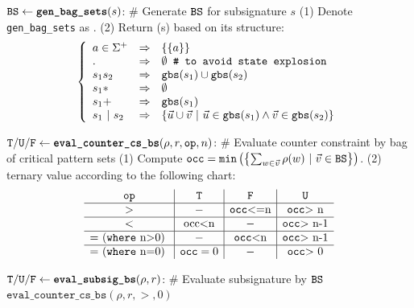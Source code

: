 \begin{small}
\begin{algorithm}[bt]
$\texttt{BS} \leftarrow {\texttt{\textbf{gen\_bag\_sets}}}(s)$: 
\newline
\# Generate $\texttt{BS}$ for subsignature $s$ \newline
(1) Denote \texttt{gen\_bag\_sets} as \gbw. \newline
(2) Return \bw(s) based on its structure:
\[
\left\{ 
\begin{array}{l l l}
	a \in \Sigma^+ &\Rightarrow & \{\{a\}\} \\
	. 	& \Rightarrow & \emptyset \texttt{~\# to avoid state explosion} \\
	s_1s_2 & \Rightarrow& \texttt{gbs}(s_1) \cup \texttt{gbs}(s_2) \\
	s_1 *& \Rightarrow& \emptyset \\
	s_1+ & \Rightarrow& \texttt{gbs}(s_1) \\
	s_1~|~s_2 & \Rightarrow& \{\vec{u} \cup \vec{v}~|~ \vec{u} \in \texttt{gbs}(s_1) \wedge \vec{v}\in \texttt{gbs}(s_2) \}
\end{array}
\right.
\]

$\texttt{T}/\texttt{U}/\texttt{F} \leftarrow \texttt{\textbf{eval\_counter\_cs\_bs}}(\rho, r, \texttt{op}, n)$:  \newline
\# Evaluate counter constraint by bag of critical pattern sets \newline
(1) Compute $\texttt{occ} = \texttt{min}\left(\left\{ \sum_{w \in \vec{v}} \rho(w) ~|~ \vec{v} \in \texttt{BS}\right\}\right)$. \newline
(2) \return ternary value according to the following chart:
\[
\begin{array}{c|c|c|c}
	\op & \true & \false & \unknown \\
	\hline
      $>$  & - 		& $\occ <=n$ & $\occ > n$ \\
	\hline
      $<$  & $occ<n$ & - 		 & $\occ > n-1$ \\
	\hline
      $= (\texttt{where} n>0) $  & - & $\occ <n$ & $\occ > n-1$ \\
	\hline
      $= (\texttt{where} n=0) $  & \occ=0 &  -  & $\occ > 0$ \\
\end{array}
\]

$\texttt{T}/\texttt{U}/\texttt{F} \leftarrow \texttt{\textbf{eval\_subsig\_bs}}(\rho, r)$:  \newline
\# Evaluate subsignature by $\texttt{BS}$ \newline
\return $\texttt{eval\_counter\_cs\_bs}(\rho, r, >, 0)$


\end{algorithm}
\end{small}
